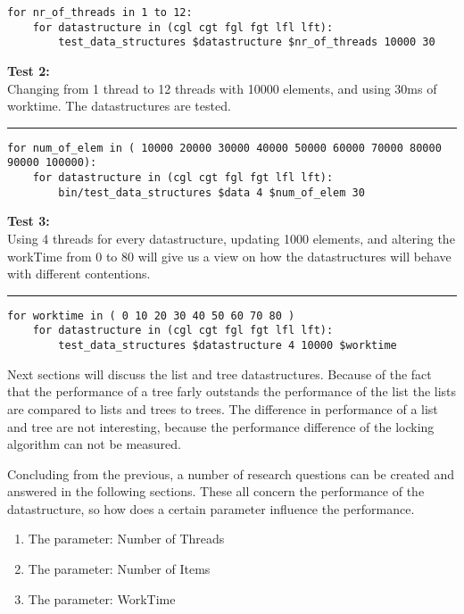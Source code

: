 \documentclass[10pt,a4paper]{article}
\begin{document}
\begin{lstlisting}
for nr_of_threads in 1 to 12:
    for datastructure in (cgl cgt fgl fgt lfl lft):
        test_data_structures $datastructure $nr_of_threads 10000 30  
\end{lstlisting}


\textbf{Test 2:} \\
Changing from 1 thread to 12 threads with 10000 elements, and using 30ms of 
worktime. The datastructures are tested.
\vspace{0.1cm}
\hrule
\vspace{0.1cm}
\begin{lstlisting}
for num_of_elem in ( 10000 20000 30000 40000 50000 60000 70000 80000 90000 100000):
    for datastructure in (cgl cgt fgl fgt lfl lft):
        bin/test_data_structures $data 4 $num_of_elem 30
\end{lstlisting}

\textbf{Test 3:} \\
Using 4 threads for every datastructure, updating 1000 elements, and altering the workTime from 0 to 80 will give us a view on how the datastructures will behave with different contentions. 
\vspace{0.1cm}
\hrule
\vspace{0.1cm}
\begin{lstlisting}
for worktime in ( 0 10 20 30 40 50 60 70 80 )
    for datastructure in (cgl cgt fgl fgt lfl lft):
        test_data_structures $datastructure 4 10000 $worktime  
\end{lstlisting}

Next sections will discuss the list and tree datastructures. Because of the fact that the performance of a tree farly outstands the performance of the list the lists are compared to lists and trees to trees. The difference in performance of a list and tree are not interesting, because the performance difference of the locking algorithm can not be measured.

Concluding from the previous, a number of research questions can be created and answered in the following sections. These all concern the performance of the datastructure, so how does a certain parameter influence the performance.
\begin{enumerate}
\item The parameter: Number of Threads 
\item The parameter: Number of Items 
\item The parameter: WorkTime 
\end{enumerate}
\end{document}
